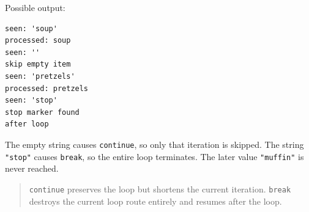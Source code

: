 Possible output:

\begin{verbatim}
seen: 'soup'
processed: soup
seen: ''
skip empty item
seen: 'pretzels'
processed: pretzels
seen: 'stop'
stop marker found
after loop
\end{verbatim}

The empty string causes \texttt{continue}, so only that iteration is skipped. The string \texttt{"stop"} causes \texttt{break}, so the entire loop terminates. The later value \texttt{"muffin"} is never reached.

\begin{quote}
\texttt{continue} preserves the loop but shortens the current iteration. \texttt{break} destroys the current loop route entirely and resumes after the loop.
\end{quote}